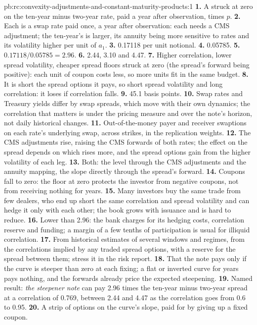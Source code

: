\begin{solution}{pb:rc:convexity-adjustments-and-constant-maturity-products:1}
\textbf{1.} A  struck at zero on the ten-year minus two-year rate,
paid a year after observation, times $p$.
\textbf{2.} Each is a swap rate paid once, a year after observation: each needs a
CMS adjustment; the ten-year's is larger, its annuity being more sensitive to
rates and its volatility higher per unit of $a_1$.
\textbf{3.} 0.17118 per unit notional.
\textbf{4.} 0.05785.
\textbf{5.} $0.17118/0.05785 = 2.96$.
\textbf{6.} 2.44, 3.10 and 4.47.
\textbf{7.} Higher correlation, lower spread volatility, cheaper spread floors
struck at zero (the spread's forward being positive): each unit of coupon
costs less, so more units fit in the same budget.
\textbf{8.} It is short the spread options it pays, so short spread volatility and
long correlation: it loses if correlation falls.
\textbf{9.} 45.1 basis points.
\textbf{10.} Swap rates and Treasury yields differ by swap spreads, which move with
their own dynamics; the correlation that matters is under the pricing measure
and over the note's horizon, not daily historical changes.
\textbf{11.} Out-of-the-money payer and receiver swaptions on each rate's
underlying swap, across strikes, in the replication weights.
\textbf{12.} The CMS adjustments rise, raising the CMS forwards of both rates; the
effect on the spread depends on which rises more, and the spread options gain
from the higher volatility of each leg.
\textbf{13.} Both: the level through the CMS adjustments and the annuity mapping,
the slope directly through the spread's forward.
\textbf{14.} Coupons fall to zero: the floor at zero protects the investor from
negative coupons, not from receiving nothing for years.
\textbf{15.} Many investors buy the same trade from few dealers, who end up short
the same correlation and spread volatility and can hedge it only with each
other; the book grows with issuance and is hard to reduce.
\textbf{16.} Lower than 2.96: the bank charges for its hedging costs, correlation
reserve and funding; a margin of a few tenths of participation is usual for
illiquid correlation.
\textbf{17.} From historical estimates of several windows and regimes, from the
correlations implied by any traded spread options, with a reserve for the
spread between them; stress it in the risk report.
\textbf{18.} That the note pays only if the curve is steeper than zero at each
fixing; a flat or inverted curve for years pays nothing, and the forwards
already price the expected steepening.
\textbf{19.} Named result: \emph{the steepener note} can pay 2.96 times the ten-year
minus two-year spread at a correlation of 0.769, between 2.44 and 4.47 as the
correlation goes from 0.6 to 0.95.
\textbf{20.} A strip of options on the curve's slope, paid for by giving up a fixed
coupon.
\end{solution}

